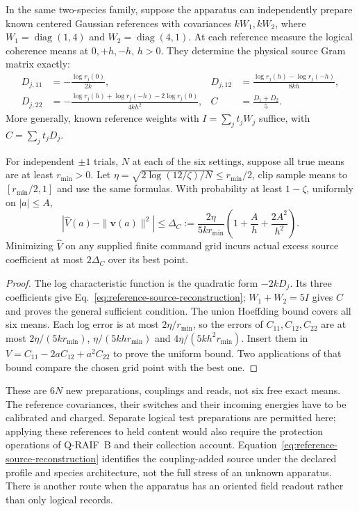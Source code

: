 \begin{proposition}
\label{prop:reference-source-identification}
In the same two-species family, suppose the apparatus can independently
prepare known centered Gaussian references with covariances $kW_1,kW_2$,
where $W_1=\operatorname{diag}(1,4)$ and
$W_2=\operatorname{diag}(4,1)$. At each reference measure the logical
coherence means at $0,+h,-h$, $h>0$. They determine the physical source
Gram matrix exactly:
\begin{align}
 D_{j,11}&=-\frac{\log r_j(0)}{2k},&
 D_{j,12}&=\frac{\log r_j(h)-\log r_j(-h)}{8kh},\nonumber\\
 D_{j,22}&=-\frac{\log r_j(h)+\log r_j(-h)-2\log r_j(0)}{4kh^2},&
 C&=\frac{D_1+D_2}{5}.
 \label{eq:reference-source-reconstruction}
\end{align}
More generally, known reference weights with
$I=\sum_jt_jW_j$ suffice, with $C=\sum_jt_jD_j$.

For independent $\pm1$ trials, $N$ at each of the six settings, suppose
all true means are at least $r_{\min}>0$. Let
$\eta=\sqrt{2\log(12/\zeta)/N}\le r_{\min}/2$, clip sample means to
$[r_{\min}/2,1]$ and use the same formulas. With probability at least
$1-\zeta$, uniformly on $|a|\le A$,
\begin{equation}
 |\widehat V(a)-\|\mathbf v(a)\|^2|
 \le\Delta_C:=\frac{2\eta}{5kr_{\min}}
            \left(1+\frac A h+\frac{2A^2}{h^2}\right).
 \label{eq:reference-source-error}
\end{equation}
Minimizing $\widehat V$ on any supplied finite command grid incurs
actual excess source coefficient at most $2\Delta_C$ over its best point.
\end{proposition}
\begin{proof}
The log characteristic function is the quadratic form $-2kD_j$.
Its three coefficients give Eq.~\eqref{eq:reference-source-reconstruction};
$W_1+W_2=5I$ gives $C$ and proves the general sufficient condition.
The union Hoeffding bound covers all six means. Each log error is at most
$2\eta/r_{\min}$, so the errors of $C_{11},C_{12},C_{22}$ are at most
$2\eta/(5kr_{\min})$, $\eta/(5khr_{\min})$ and
$4\eta/(5kh^2r_{\min})$. Insert them in
$V=C_{11}-2aC_{12}+a^2C_{22}$ to prove the uniform bound.
Two applications of that bound compare the chosen grid point with the best one.
\end{proof}

These are $6N$ new preparations, couplings and reads, not six free exact
means. The reference covariances, their switches and their incoming energies
have to be calibrated and charged. Separate logical test preparations are
permitted here; applying these references to held content would also require
the protection operations of Q-RAIF~B and their collection account.
Equation~\eqref{eq:reference-source-reconstruction} identifies the
coupling-added source under the declared profile and species architecture,
not the full stress of an unknown apparatus. There is another route when
the apparatus has an oriented field readout rather than only logical records.

